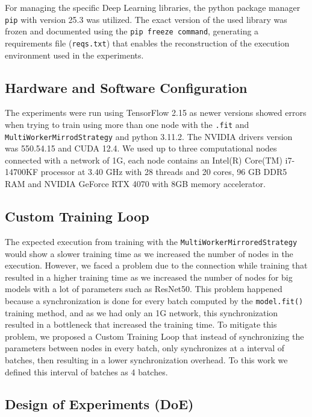 \documentclass[12pt]{article}
\begin{document}
For managing the specific Deep Learning libraries, the python package
manager \texttt{pip} with version 25.3 was utilized. The exact version of the used library was
frozen and documented using the \texttt{pip freeze command}, generating a
requirements file (\texttt{reqs.txt}) that enables the reconstruction of the
execution environment used in the experiments.

\subsection{Hardware and Software Configuration}
\label{sec:orge8b1e87}

The experiments were run using TensorFlow 2.15 as newer versions
showed errors when trying to train using more than one node with the
\texttt{.fit} and \texttt{MultiWorkerMirrodStrategy} and python 3.11.2. The NVIDIA
drivers version was 550.54.15 and CUDA 12.4. We used up to three
computational nodes connected with a network of 1G, each node contains an
Intel(R) Core(TM) i7-14700KF processor at 3.40 GHz with 28 threads and
20 cores, 96 GB DDR5 RAM and NVIDIA GeForce RTX 4070 with 8GB memory
accelerator.

\subsection{Custom Training Loop}
\label{sec:org1c051bc}

The expected execution from training with the
\texttt{MultiWorkerMirroredStrategy} would show a slower training time as we
increased the number of nodes in the execution. However, we faced a
problem due to the connection while training that resulted in a higher
training time as we increased the number of nodes for big models with
a lot of parameters such as ResNet50. This problem happened because a
synchronization is done for every batch computed by the \texttt{model.fit()}
training method, and as we had only an 1G network, this
synchronization resulted in a bottleneck that increased the training
time. To mitigate this problem, we proposed a Custom Training Loop
that instead of synchronizing the parameters between nodes in every
batch, only synchronizes at a interval of batches, then resulting in a
lower synchronization overhead. To this work we defined this
interval of batches as 4 batches.

\subsection{Design of Experiments (DoE)}
\label{sec:orgab04f8d}
\end{document}
